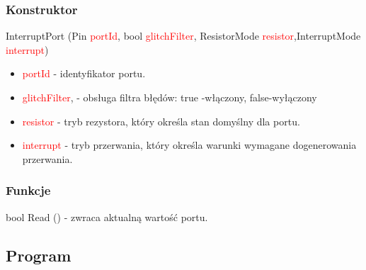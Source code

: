 \documentclass{article}
\begin{document}
\subsubsection{Konstruktor}
 InterruptPort (Pin \textcolor{red}{portId}, bool \textcolor{red}{glitchFilter}, ResistorMode \textcolor{red}{resistor},\newline InterruptMode \textcolor{red}{interrupt})
\begin{itemize}
\item \textcolor{red}{portId} - identyfikator portu.
\item \textcolor{red}{glitchFilter}, - obsługa filtra błędów: true -włączony, false-wyłączony
\item \textcolor{red}{resistor} - tryb rezystora, który określa stan domyślny dla portu.
\item \textcolor{red}{interrupt} - tryb przerwania, który określa warunki wymagane do\newline generowania przerwania.
\end{itemize}
\subsubsection{Funkcje}
bool Read () - zwraca aktualną wartość portu.

\subsection{Program}
\end{document}
